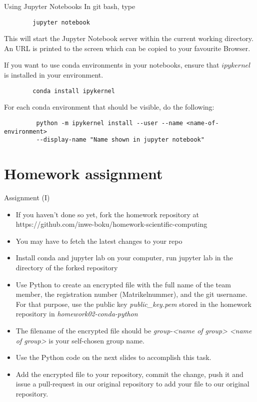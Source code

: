 \begin{frame}[fragile]{Using Jupyter Notebooks}
		In git bash, type
		\begin{verbatim}
		jupyter notebook
		\end{verbatim}
		This will start the Jupyter Notebook server within the current working directory. An URL is printed to the screen which can be copied to your favourite Browser.

		If you want to use conda environments in your notebooks, ensure that $ipykernel$ is installed in your environment.
		\begin{verbatim}
		conda install ipykernel
		\end{verbatim}
		For each conda environment that should be visible, do the following:
		\begin{verbatim}
		 python -m ipykernel install --user --name <name-of-environment>
		 --display-name "Name shown in jupyter notebook"
		 \end{verbatim}

\end{frame}


\section{Homework assignment}

\begin{frame}{Assignment (I)}

	\begin{itemize}
		\item If you haven't done so yet, fork the homework repository at https://github.com/inwe-boku/homework-scientific-computing
		\item You may have to fetch the latest changes to your repo
		\item Install conda and jupyter lab on your computer, run jupyter lab in the directory of the forked repository
		\item Use Python to create an encrypted file with the full name of the team member, the registration number (Matrikelnummer), and the git username. For that purpose, use the public key \textit{public\_key.pem} stored in the homework repository in \textit{homework02-conda-python}
		\item The filename of the encrypted file should be \textit{group-<name of group>} \textit{<name of group>} is your self-chosen group name.
		\item Use the Python code on the next slides to accomplish this task.
		\item Add the encrypted file to your repository, commit the change, push it and issue a pull-request in our original repository to add your file to our original repository.


	\end{itemize}


\end{frame}

